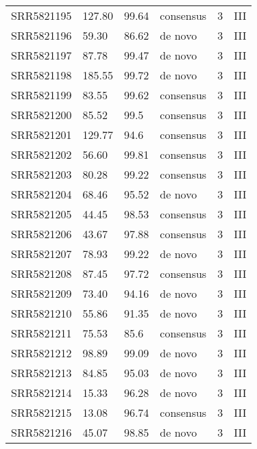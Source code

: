 \begin{scriptsize}
\begin{center}
\begin{longtable}{@{}llllll@{}}
SRR5821195 & 127.80        & 99.64       & consensus    & 3        & III      \\
SRR5821196 & 59.30         & 86.62       & de novo      & 3        & III      \\
SRR5821197 & 87.78         & 99.47       & de novo      & 3        & III      \\
SRR5821198 & 185.55        & 99.72       & de novo      & 3        & III      \\
SRR5821199 & 83.55         & 99.62       & consensus    & 3        & III      \\
SRR5821200 & 85.52         & 99.5        & consensus    & 3        & III      \\
SRR5821201 & 129.77        & 94.6        & consensus    & 3        & III      \\
SRR5821202 & 56.60         & 99.81       & consensus    & 3        & III      \\
SRR5821203 & 80.28         & 99.22       & consensus    & 3        & III      \\
SRR5821204 & 68.46         & 95.52       & de novo      & 3        & III      \\
SRR5821205 & 44.45         & 98.53       & consensus    & 3        & III      \\
SRR5821206 & 43.67         & 97.88       & consensus    & 3        & III      \\
SRR5821207 & 78.93         & 99.22       & de novo      & 3        & III      \\
SRR5821208 & 87.45         & 97.72       & consensus    & 3        & III      \\
SRR5821209 & 73.40         & 94.16       & de novo      & 3        & III      \\
SRR5821210 & 55.86         & 91.35       & de novo      & 3        & III      \\
SRR5821211 & 75.53         & 85.6        & consensus    & 3        & III      \\
SRR5821212 & 98.89         & 99.09       & de novo      & 3        & III      \\
SRR5821213 & 84.85         & 95.03       & de novo      & 3        & III      \\
SRR5821214 & 15.33         & 96.28       & de novo      & 3        & III      \\
SRR5821215 & 13.08         & 96.74       & consensus    & 3        & III      \\
SRR5821216 & 45.07         & 98.85       & de novo      & 3        & III      \\

\end{longtable}
\end{center}
\end{scriptsize}
